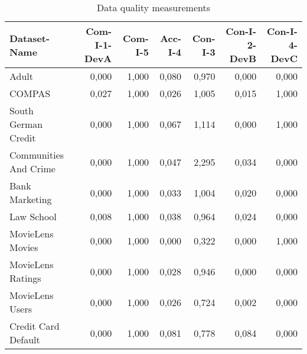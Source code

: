 \begin{table}[t]
\caption{Data quality measurements}
\label{tab:dataquality}
\begin{tabular}{|p{2cm}|r|r|r|r|r|r|}
\hline
Dataset-Name & Com-I-1-DevA & Com-I-5 & Acc-I-4 & Con-I-3 & Con-I-2-DevB & Con-I-4-DevC \\
\hline
Adult & 0,000 & 1,000 & 0,080 & 0,970 & 0,000 & 0,000 \\
COMPAS & 0,027 & 1,000 & 0,026 & 1,005 & 0,015 & 1,000 \\
South German Credit & 0,000 & 1,000 & 0,067 & 1,114 & 0,000 & 1,000 \\
Communities And Crime & 0,000 & 1,000 & 0,047 & 2,295 & 0,034 & 0,000 \\
Bank Marketing & 0,000 & 1,000 & 0,033 & 1,004 & 0,020 & 0,000 \\
Law School & 0,008 & 1,000 & 0,038 & 0,964 & 0,024 & 0,000 \\
MovieLens Movies & 0,000 & 1,000 & 0,000 & 0,322 & 0,000 & 1,000 \\
MovieLens Ratings & 0,000 & 1,000 & 0,028 & 0,946 & 0,000 & 0,000 \\
MovieLens Users & 0,000 & 1,000 & 0,026 & 0,724 & 0,002 & 0,000 \\
Credit Card Default & 0,000 & 1,000 & 0,081 & 0,778 & 0,084 & 0,000 \\
\hline
\end{tabular}
\end{table}
